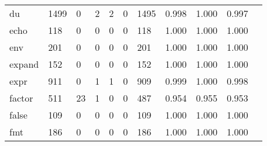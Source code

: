 \begin{longtable}{lp{1.10cm}p{1.10cm}p{1.10cm}p{1.10cm}p{1.10cm}p{1.10cm}p{1.10cm}p{1.10cm}p{1.10cm}p{1.10cm}}
du        &                   1499 &                                  0 &                                 2 &                                2 &                                 0 &                            1495 &                             0.998 &                                 1.000 &                               0.997 \\
echo      &                    118 &                                  0 &                                 0 &                                0 &                                 0 &                             118 &                             1.000 &                                 1.000 &                               1.000 \\
env       &                    201 &                                  0 &                                 0 &                                0 &                                 0 &                             201 &                             1.000 &                                 1.000 &                               1.000 \\
expand    &                    152 &                                  0 &                                 0 &                                0 &                                 0 &                             152 &                             1.000 &                                 1.000 &                               1.000 \\
expr      &                    911 &                                  0 &                                 1 &                                1 &                                 0 &                             909 &                             0.999 &                                 1.000 &                               0.998 \\
factor    &                    511 &                                 23 &                                 1 &                                0 &                                 0 &                             487 &                             0.954 &                                 0.955 &                               0.953 \\
false     &                    109 &                                  0 &                                 0 &                                0 &                                 0 &                             109 &                             1.000 &                                 1.000 &                               1.000 \\
fmt       &                    186 &                                  0 &                                 0 &                                0 &                                 0 &                             186 &                             1.000 &                                 1.000 &                               1.000 \\

\end{longtable}
